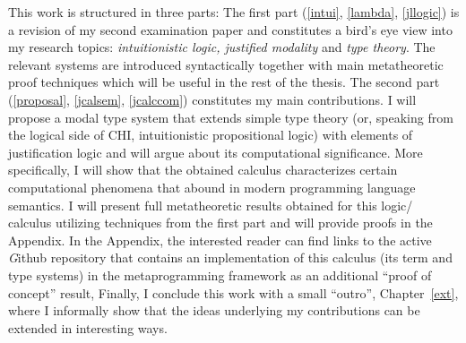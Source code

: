           This work  is structured in three parts: 
           The first part (\cref{intui}, \cref{lambda}, \cref{jllogic}) is a revision of my second examination paper and constitutes 
           a bird's eye view into my 
           research topics:  
           \emph{intuitionistic logic, justified modality} and \emph{type theory}. 
           The relevant systems are introduced syntactically together with main 
            metatheoretic proof techniques which will be useful 
           in the rest of the thesis.
           The second part (\cref{proposal}, \cref{jcalsem}, \cref{jcalccom}) 
           constitutes my main contributions.
           I will propose  
           a modal type system that extends simple type theory
            (or, speaking from the logical side of \ac{CHI}, 
           intuitionistic propositional logic) with elements of
            justification logic and will argue about its computational significance. 
            More specifically, I will show  
           that the obtained calculus characterizes  certain 
           computational phenomena that abound in modern programming language semantics. 
           I will present full metatheoretic
           results obtained for this logic/ calculus utilizing techniques from the first part 
           and will provide proofs in the Appendix. 
           In the Appendix, the interested reader can find links to the active {\textit Github} repository 
           that contains an implementation of  this calculus 
           (its term and type systems)
           in the metaprogramming framework  
           as an additional  ``proof of concept'' result,  
           Finally, I conclude this work with a small ``outro'', Chapter~\ref{ext},
           where I informally show that the ideas underlying my contributions 
           can be extended in interesting ways.



